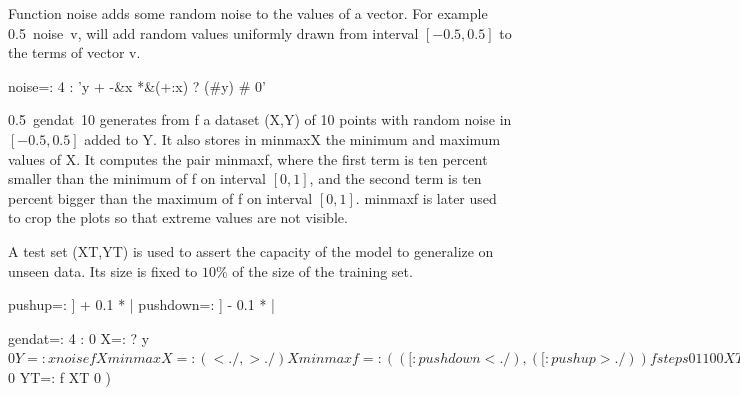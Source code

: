 \documentclass[10pt]{article}%
\begin{document}
Function {\Tt{}noise\nwendquote} adds some random noise to the values of a vector. For
example {\Tt{}0.5\ noise\ v\nwendquote}, will add random values uniformly drawn from interval
$[-0.5,0.5]$ to the terms of vector {\Tt{}v\nwendquote}.

\nwenddocs{}\endmoddef\nwstartdeflinemarkup{}\nwenddeflinemarkup
noise=: 4 : 'y + -&x *&(+:x) ? (#y) # 0'

\nwendcode{}\nwdocspar
{\Tt{}0.5\ gendat\ 10\nwendquote} generates from {\Tt{}f\nwendquote} a dataset {\Tt{}(X,Y)\nwendquote} of 10 points with
random noise in $[-0.5,0.5]$ added to {\Tt{}Y\nwendquote}. It also stores in {\Tt{}minmaxX\nwendquote} the
minimum and maximum values of {\Tt{}X\nwendquote}. It computes the pair {\Tt{}minmaxf\nwendquote},
where the first term is ten percent smaller than the minimum of {\Tt{}f\nwendquote} on interval
$[0,1]$, and the second term is ten percent bigger than the maximum of {\Tt{}f\nwendquote} on
interval $[0,1]$. {\Tt{}minmaxf\nwendquote} is later used to crop the plots so that
extreme values are not visible.

A test set {\Tt{}(XT,YT)\nwendquote} is used to assert the capacity of the model to generalize
on unseen data. Its size is fixed to $10\%$ of the size of the training set.

\nwenddocs{}\endmoddef\nwstartdeflinemarkup{}\nwenddeflinemarkup
pushup=:   ] + 0.1 * |
pushdown=: ] - 0.1 * |

\nwendcode{}\endmoddef\nwstartdeflinemarkup{}\nwenddeflinemarkup
gendat=: 4 : 0
  X=: ? y $ 0
  Y=: x noise f X
  minmaxX=: (<./ , >./) X
  minmaxf=: (([: pushdown <./) , ([: pushup >./)) f steps 0 1 100
  XT=: ? (>. 0.1 * y) $ 0
  YT=: f XT
  0
)
\end{document}
